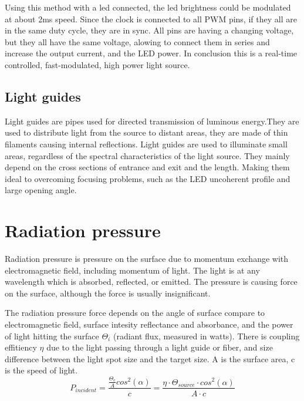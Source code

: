 \documentclass[\main/master.tex]{subfiles}
\begin{document}
\par
Using this method with a led connected, the led brightness could be modulated at about 2ms speed. Since the clock is connected to all PWM pins, if they all are in the same duty cycle, they are in sync. All pins are having a changing voltage, but they all have the same voltage, alowing to connect them in series and increase the output current, and the LED power. In conclusion this is a real-time controlled, fast-modulated, high power light source. 



\subsection{Light guides}
Light guides are pipes used for directed transmission of luminous energy.They are used to distribute light from the source to distant areas, they are made of thin filaments causing internal reflections. Light guides are used to illuminate small areas, regardless of the spectral characteristics of the light source. They mainly depend on the cross sections of entrance and exit and the length. Making them ideal to overcoming focusing problems, such as the LED uncoherent profile and large opening angle. 


\section{Radiation pressure}
Radiation pressure is pressure on the surface due to momentum exchange with electromagnetic field, including momentum of light. The light is at any wavelength which is absorbed, reflected, or emitted. The pressure is causing force on the surface, although the force is usually insignificant.
  
\par
The radiation pressure force depends on the angle of surface compare to electromagnetic field, surface intesity reflectance and absorbance, and the power of light hitting the surface $\Theta_i$ (radiant flux, measured in watts). There is coupling effitiency $\eta$ due to the light passing through a light guide or fiber, and size difference between the light spot size and the target size. A is the surface area, c is the speed of light. 
\begin{equation}
P_{incident} = \frac{\frac{\Theta_e}{A}cos^2(\alpha)}{c} = \frac{\eta\cdot \Theta_{source}\cdot cos^2(\alpha)}{{A\cdot c}} \label{eqn:energy-mass-equivalence-relation}
\end{equation}
\end{document}
